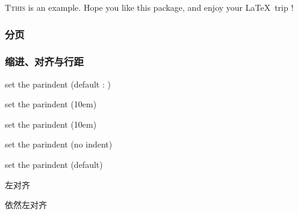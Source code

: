             \lettrine{T}{this} is an example. Hope you like this package, and enjoy your \LaTeX\ trip !
            
        \subsubsection{分页}
            \newpage %
            \mbox{}
            \newpage
        
        \subsubsection{缩进、对齐与行距}
            set the parindent (default : \the\parindent)
        
            {\setlength{\parindent}{10em} set the parindent (10em)

            set the parindent (10em)}

            \noindent set the parindent (no indent)

            set the parindent (default)

            \begin{flushleft}
                左对齐

                依然左对齐
            \end{flushleft}

